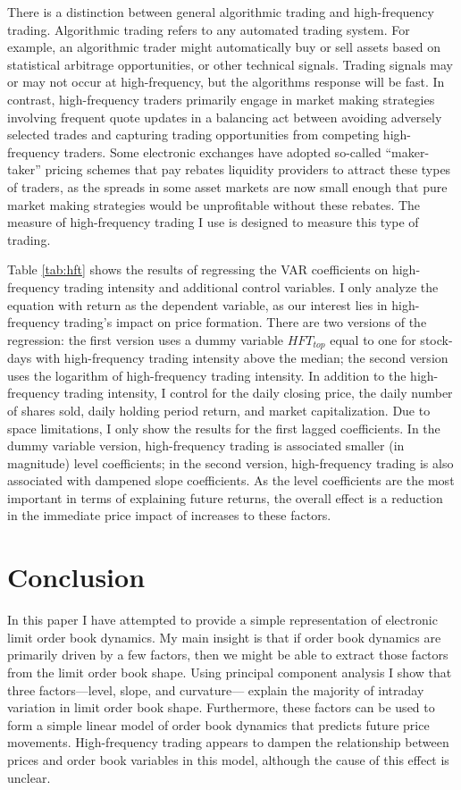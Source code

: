 There is a distinction between general algorithmic trading and high-frequency trading. Algorithmic trading refers to any automated trading system. For example, an algorithmic trader might automatically buy or sell assets based on statistical arbitrage opportunities, or other technical signals. Trading signals may or may not occur at high-frequency, but the algorithms response will be fast. In contrast, high-frequency traders primarily engage in market making strategies involving frequent quote updates in a balancing act between avoiding adversely selected trades and capturing trading opportunities from competing high-frequency traders. Some electronic exchanges have adopted so-called ``maker-taker'' pricing schemes that pay rebates liquidity providers to attract these types of traders, as the spreads in some asset markets are now small enough that pure market making strategies would be unprofitable without these rebates. The measure of high-frequency trading I use is designed to measure this type of trading.

Table \ref{tab:hft} shows the results of regressing the VAR coefficients on high-frequency trading intensity and additional control variables. I only analyze the equation with return as the dependent variable, as our interest lies in high-frequency trading's impact on price formation. There are two versions of the regression: the first version uses a dummy variable $HFT_{top}$ equal to one for stock-days with high-frequency trading intensity above the median; the second version uses the logarithm of high-frequency trading intensity. In addition to the high-frequency trading intensity, I control for the daily closing price, the daily number of shares sold, daily holding period return, and market capitalization. Due to space limitations, I only show the results for the first lagged coefficients. In the dummy variable version, high-frequency trading is associated smaller (in magnitude) level coefficients; in the second version, high-frequency trading is also associated with dampened slope coefficients. As the level coefficients are the most important in terms of explaining future returns, the overall effect is a reduction in the immediate price impact of increases to these factors.

\section{Conclusion}
\label{conclusion}

In this paper I have attempted to provide a simple representation of electronic limit order book dynamics. My main insight is that if order book dynamics are primarily driven by a few factors, then we might be able to extract those factors from the limit order book shape. Using principal component analysis I show that three factors---level, slope, and curvature--- explain the majority of intraday variation in limit order book shape. Furthermore, these factors can be used to form a simple linear model of order book dynamics that predicts future price movements. High-frequency trading appears to dampen the relationship between prices and order book variables in this model, although the cause of this effect is unclear.


